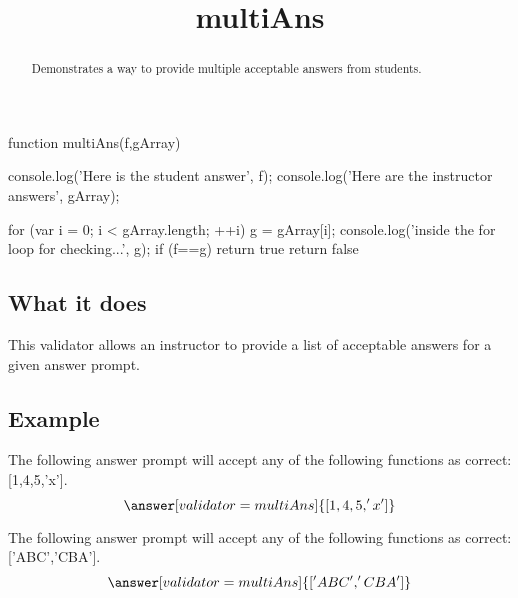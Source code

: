 \documentclass{ximera}
\title{multiAns}
\begin{document}
\begin{abstract}
    Demonstrates a way to provide multiple acceptable answers from students.
\end{abstract}
\maketitle

\begin{javascript}

function multiAns(f,gArray) {
          
    console.log('Here is the student answer', f);   
    console.log('Here are the instructor answers', gArray);
     
    for (var i = 0; i < gArray.length; ++i) {
        g = gArray[i];
        console.log('inside the for loop for checking...', g);
        if (f==g){
            return true
        }
    }
return false
}
  
\end{javascript}

\subsection*{What it does}
    This validator allows an instructor to provide a list of acceptable answers for a given answer prompt.

\subsection*{Example}
    \begin{problem}
        The following answer prompt will accept any of the following functions as correct: [1,4,5,'x']. 
        \[
            \answer[validator=multiAns]{[1,4,5,'x']}
        \]
    \end{problem}

    \begin{problem}
        The following answer prompt will accept any of the following functions as correct: ['ABC','CBA']. 
        \[
            \answer[validator=multiAns]{['ABC','CBA']}
        \]
    \end{problem}
\end{document}
